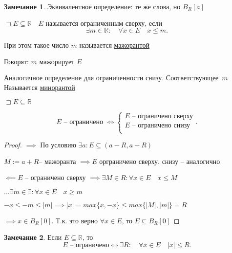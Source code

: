 \documentclass{book}
\newcommand\R{\ensuremath{\mathbb{R}}}
\theoremstyle{definition}
\newtheorem*{note}{Замечание}
\begin{document}
    \begin{note}
        Эквивалентное определение: те же слова, но $B_R[a]$
    \end{note}

    \begin{definition}
        $\sqsupset  E \subseteq \R\quad E$ называется ограниченным сверху, если \[
        \exists m\in \R:\quad \forall x\in E\quad x\leqslant m
        .\] 

        При этом такое число $m$ называется \underline{мажорантой}

        Говорят: $m$ мажорирует $E$


        Аналогичное определение для ограниченности снизу. 
        Соответствующее~$m$ Называется \underline{минорантой}
    \end{definition}

    \begin{statement}
        $\sqsupset E\subseteq \R$

        \[
        E \text{ -- ограничено } \iff  \begin{cases}
            E \text{ --  ограничено сверху}\\
            E \text{ -- ограничено снизу}\\
        \end{cases}
        .\] 
    \end{statement}
    \begin{proof}
        $\implies $ По условию $\exists a: E\subseteq (a-R, a+R)$

        $M:=a+R$-- мажоранта $\implies E$ орграничено сверху. снизу -- аналогично    

        $\impliedby E$ -- ограничено сверху $\implies \exists M\in R: \forall x\in E\quad x\leqslant M$

        $\ldots \exists m\in \exists : \forall x\in E\quad x\geqslant m$

        $-x\leqslant -m \leqslant |m| \implies  |x| = max\{x, -x\}\leqslant max\{|M|, |m|\} = R$

        $\implies  x\in B_R[0]$. Т.к. это верно $\forall x\in E$, то $E \subseteq  B_R[0]$
    \end{proof}

    \begin{note}
        Если $E\subseteq \R$, то \[
            E \text{ -- ограничено} \iff  \exists R:\quad \forall x\in E\quad |x|\leqslant R
        .\] 
    \end{note}
\end{document}
